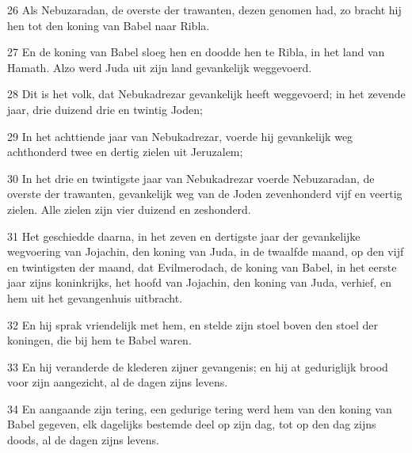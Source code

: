 \par 26 Als Nebuzaradan, de overste der trawanten, dezen genomen had, zo bracht hij hen tot den koning van Babel naar Ribla.
\par 27 En de koning van Babel sloeg hen en doodde hen te Ribla, in het land van Hamath. Alzo werd Juda uit zijn land gevankelijk weggevoerd.
\par 28 Dit is het volk, dat Nebukadrezar gevankelijk heeft weggevoerd; in het zevende jaar, drie duizend drie en twintig Joden;
\par 29 In het achttiende jaar van Nebukadrezar, voerde hij gevankelijk weg achthonderd twee en dertig zielen uit Jeruzalem;
\par 30 In het drie en twintigste jaar van Nebukadrezar voerde Nebuzaradan, de overste der trawanten, gevankelijk weg van de Joden zevenhonderd vijf en veertig zielen. Alle zielen zijn vier duizend en zeshonderd.
\par 31 Het geschiedde daarna, in het zeven en dertigste jaar der gevankelijke wegvoering van Jojachin, den koning van Juda, in de twaalfde maand, op den vijf en twintigsten der maand, dat Evilmerodach, de koning van Babel, in het eerste jaar zijns koninkrijks, het hoofd van Jojachin, den koning van Juda, verhief, en hem uit het gevangenhuis uitbracht.
\par 32 En hij sprak vriendelijk met hem, en stelde zijn stoel boven den stoel der koningen, die bij hem te Babel waren.
\par 33 En hij veranderde de klederen zijner gevangenis; en hij at geduriglijk brood voor zijn aangezicht, al de dagen zijns levens.
\par 34 En aangaande zijn tering, een gedurige tering werd hem van den koning van Babel gegeven, elk dagelijks bestemde deel op zijn dag, tot op den dag zijns doods, al de dagen zijns levens.


